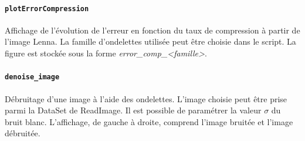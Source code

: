\documentclass[a4paper,12pt, openany, twoside]{article}
\theoremstyle{break}
\begin{document}
\paragraph{\texttt{plotErrorCompression}}
Affichage de l'évolution de l'erreur en fonction du taux de compression à partir de l'image Lenna. La famille d'ondelettes utilisée peut être choisie dans le script. La figure est stockée sous la forme \textit{error\_comp\_<famille>}.

\paragraph{\texttt{denoise\_image}}
Débruitage d'une image à l'aide des ondelettes. L'image choisie peut être prise parmi la DataSet de ReadImage. Il est possible de paramétrer la valeur $\sigma$ du bruit blanc. L'affichage, de gauche à droite, comprend l'image bruitée et l'image débruitée.
\end{document}
